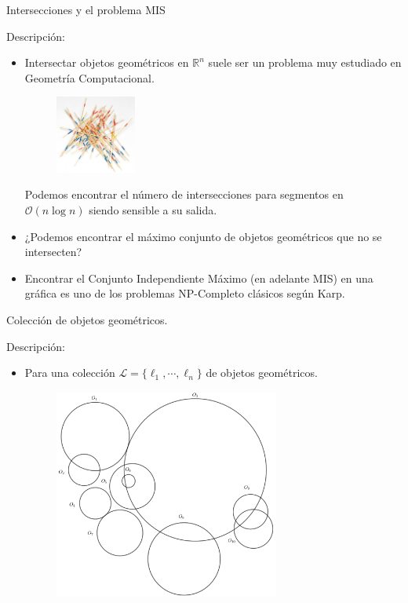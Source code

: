 \begin{frame}{Intersecciones y el problema MIS}
  
  Descripción:
  
  \begin{itemize}[<+->]
  \item Intersectar objetos geométricos en $\mathbb{R}^n$ suele
    ser un problema muy estudiado en Geometría Computacional.
    \begin{figure}  
      \centering
      \includegraphics[width=0.25\textwidth]{./Images/Intersecciones.png}
    \end{figure}
    Podemos encontrar el número de intersecciones para segmentos en $\mathcal{O}(n \log n)$
    siendo sensible a su salida.
  \item ¿Podemos encontrar el máximo conjunto de objetos geométricos que no se intersecten?
  \item Encontrar el Conjunto Independiente Máximo (en adelante MIS) en una gráfica
    es uno de los problemas NP-Completo clásicos según Karp.
  \end{itemize}
\end{frame}

\begin{frame}{Colección de objetos geométricos.}
  
  Descripción:
  
  \begin{itemize}[<+->]
  \item Para una colección $\mathcal{L} = \{\ell_1, \dotsm, \ell_n\}$
    de objetos geométricos.
    \begin{figure}  
      \centering
      \includegraphics[width=0.7\textwidth]{./Images/Ejemplo01.png}
    \end{figure}
  \end{itemize}
\end{frame}


